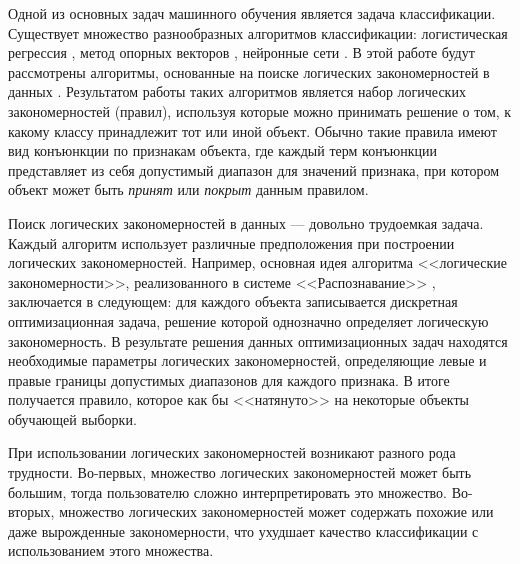 \documentclass[12pt]{article}
\begin{document}



Одной из основных задач машинного обучения является задача
классификации. Существует множество разнообразных алгоритмов
классификации: логистическая регрессия \cite{hosmer13}, метод опорных
векторов \cite{cortes95}, нейронные сети \cite{bishop95neural}. В этой
работе будут рассмотрены алгоритмы, основанные на поиске логических
закономерностей в данных \cites{ryazanov07logic, kovshov08,
  vainzvaig73kora}. Результатом работы таких алгоритмов является набор
логических закономерностей (правил), используя которые можно принимать
решение о том, к какому классу принадлежит тот или иной объект. Обычно
такие правила имеют вид конъюнкции по признакам объекта, где каждый
терм конъюнкции представляет из себя допустимый диапазон для значений
признака, при котором объект может быть \emph{принят} или
\emph{покрыт} данным правилом.

Поиск логических закономерностей в данных --- довольно трудоемкая
задача. Каждый алгоритм использует различные предположения при
построении логических закономерностей. Например, основная идея
алгоритма <<логические закономерности>>, реализованного в системе
<<Распознавание>> \cite{recognition06}, заключается в следующем: для
каждого объекта записывается дискретная оптимизационная задача,
решение которой однозначно определяет логическую закономерность. В
результате решения данных оптимизационных задач находятся необходимые
параметры логических закономерностей, определяющие левые и правые
границы допустимых диапазонов для каждого признака. В итоге получается
правило, которое как бы <<натянуто>> на некоторые объекты обучающей
выборки.

При использовании логических закономерностей возникают разного рода
трудности. Во-первых, множество логических закономерностей может быть
большим, тогда пользователю сложно интерпретировать это
множество. Во-вторых, множество логических закономерностей может
содержать похожие или даже вырожденные закономерности, что ухудшает
качество классификации с использованием этого множества.
\end{document}
